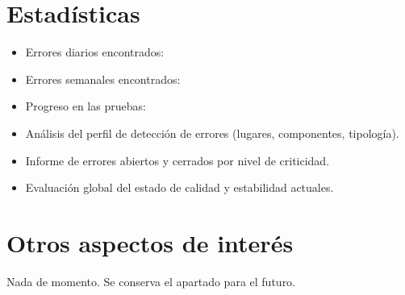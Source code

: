 \documentclass[12pt, a4paper, titlepage]{article}
\begin{document}
\section{Estadísticas}

\begin{itemize}
	\item Errores diarios encontrados:
	\item Errores semanales encontrados:
	\item Progreso en las pruebas:
	\item Análisis del perfil de detección de errores (lugares, componentes, tipología).
	\item Informe de errores abiertos y cerrados por nivel de criticidad.
	\item Evaluación global del estado de calidad y estabilidad actuales.
\end{itemize}

\section{Otros aspectos de interés}

Nada de momento. Se conserva el apartado para el futuro.
\end{document}

